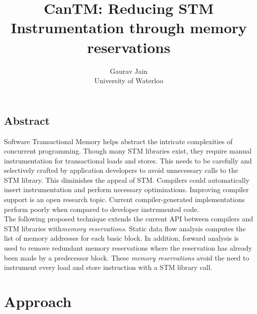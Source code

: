 \documentclass[letterpaper,twocolumn,10pt]{article}
\begin{document}
\date{}

\title{\Large \bf CanTM: Reducing STM Instrumentation through memory reservations}

\author{
{\rm Gaurav Jain}\\
University of Waterloo
} %

\maketitle

\thispagestyle{empty}


\subsection*{Abstract}
Software Transactional Memory helps abstract the intricate complexities of concurrent programming. Though many STM libraries exist, they require manual instrumentation for transactional loads and stores. This needs to be carefully and selectively crafted by application developers to avoid unnecessary calls to the STM library. This diminishes the appeal of STM. Compilers could automatically insert instrumentation and perform necessary optimizations. Improving compiler support is an open research topic. Current compiler-generated implementations perform poorly when compared to developer instrumented code.\\

The following proposed technique extends the current API between compilers and STM libraries with\emph{memory reservations}. Static data flow analysis computes the list of memory addresses for each basic block. In addition, forward analysis is used to remove redundant memory reservations where the reservation has already been made by a predecessor block. These \emph{memory reservations} avoid the need to instrument every load and store instruction with a STM library call.\\

\section{Approach}
\end{document}
